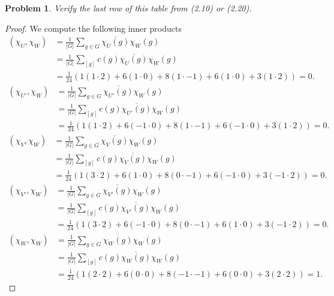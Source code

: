 \documentclass{article}
\newtheorem{problem}{Problem}
\begin{document}
\begin{problem}
Verify the last row of this table from (2.10) or (2.20).
\end{problem}
\begin{proof}
We compute the following inner products
\begin{align*}
(\chi_U, \chi_W)
&= \frac{1}{|G|} \sum_{g \in G} \overline{\chi_U(g)} \chi_W(g)\\
&= \frac{1}{|G|} \sum_{[g]} c(g) \overline{\chi_U(g)} \chi_W(g)\\
&= \frac{1}{24} (1 (1 \cdot 2) + 6 (1 \cdot 0) + 8(1 \cdot -1) + 6(1 \cdot 0) + 3(1 \cdot 2)) = 0.
\end{align*}
\begin{align*}
(\chi_{U'}, \chi_W)
&= \frac{1}{|G|} \sum_{g \in G} \overline{\chi_{U'}(g)} \chi_W(g)\\
&= \frac{1}{|G|} \sum_{[g]} c(g) \overline{\chi_{U'}(g)} \chi_W(g)\\
&= \frac{1}{24} (1 (1 \cdot 2) + 6 (-1 \cdot 0) + 8(1 \cdot -1) + 6(-1 \cdot 0) + 3(1 \cdot 2)) = 0.
\end{align*}
\begin{align*}
(\chi_V, \chi_W)
&= \frac{1}{|G|} \sum_{g \in G} \overline{\chi_V(g)} \chi_W(g)\\
&= \frac{1}{|G|} \sum_{[g]} c(g) \overline{\chi_V(g)} \chi_W(g)\\
&= \frac{1}{24} (1 (3 \cdot 2) + 6 (1 \cdot 0) + 8(0 \cdot -1) + 6(-1 \cdot 0) + 3(-1 \cdot 2)) = 0.
\end{align*}
\begin{align*}
(\chi_{V'}, \chi_W)
&= \frac{1}{|G|} \sum_{g \in G} \overline{\chi_{V'}(g)} \chi_W(g)\\
&= \frac{1}{|G|} \sum_{[g]} c(g) \overline{\chi_{V'}(g)} \chi_W(g)\\
&= \frac{1}{24} (1 (3 \cdot 2) + 6 (-1 \cdot 0) + 8(0 \cdot -1) + 6(1 \cdot 0) + 3(-1 \cdot 2)) = 0.
\end{align*}
\begin{align*}
(\chi_W, \chi_W)
&= \frac{1}{|G|} \sum_{g \in G} \overline{\chi_W(g)} \chi_W(g)\\
&= \frac{1}{|G|} \sum_{[g]} c(g) \overline{\chi_W(g)} \chi_W(g)\\
&= \frac{1}{24} (1 (2 \cdot 2) + 6 (0 \cdot 0) + 8(-1 \cdot -1) + 6(0 \cdot 0) + 3(2 \cdot 2)) = 1.
\end{align*}
\end{proof}
\end{document}
